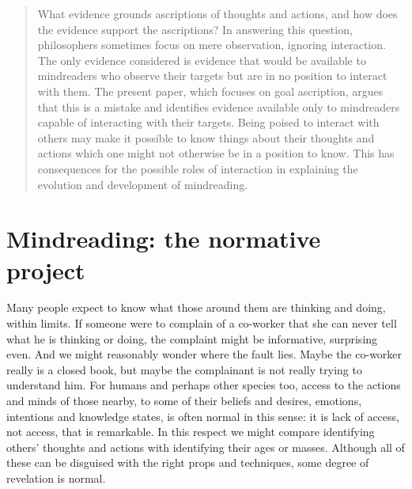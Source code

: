 \documentclass[14pt,a4paper]{extarticle}
\begin{document}
\setlength\footnotesep{1em}


\maketitle

\begin{abstract}
What evidence grounds ascriptions of thoughts and actions,
and how does the evidence support the ascriptions?
In answering this question, 
philosophers sometimes focus on mere observation, ignoring interaction.
The only evidence considered is 
evidence that would be available to mindreaders who observe their targets but are in no position to interact with them.
The present paper,
which focuses on goal ascription,
argues that this is a mistake
and
identifies evidence 
available only to mindreaders capable of interacting with their targets.
Being poised to interact with others may make it possible to know things about their thoughts and actions which one might not otherwise be in a position to know.
This has consequences for the possible roles of interaction in explaining the evolution and development of mindreading. 



\end{abstract}


\section{Mindreading: the normative project}

Many people expect to know what those around them are thinking and doing, within limits.
If someone were to complain of a co-worker that she can never tell what he is thinking or doing,
the complaint might be informative, surprising even.
And we might reasonably wonder where the fault lies.
Maybe the co-worker really is a closed book,
but maybe the complainant is not really trying to understand him.
For humans and perhaps other species too,
access to the actions and minds of those nearby,
to some of their beliefs and desires,
emotions, intentions and knowledge states,
is often normal in this sense: it is lack of access, not access, that is remarkable.
In this respect we might compare identifying others' thoughts and actions with identifying their ages or masses.
Although all of these can be disguised with the right props and techniques, some degree of revelation is normal.
\end{document}
